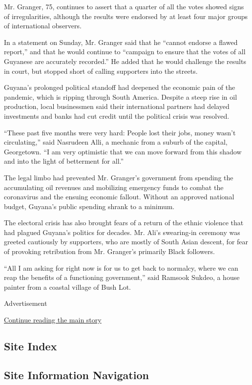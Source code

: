Mr. Granger, 75, continues to assert that a quarter of all the votes
showed signs of irregularities, although the results were endorsed by at
least four major groups of international observers.

In a statement on Sunday, Mr. Granger said that he ``cannot endorse a
flawed report,'' and that he would continue to ``campaign to ensure that
the votes of all Guyanese are accurately recorded.'' He added that he
would challenge the results in court, but stopped short of calling
supporters into the streets.

Guyana's prolonged political standoff had deepened the economic pain of
the pandemic, which is ripping through South America. Despite a steep
rise in oil production, local businessmen said their international
partners had delayed investments and banks had cut credit until the
political crisis was resolved.

``These past five months were very hard: People lost their jobs, money
wasn't circulating,'' said Nasrudeen Alli, a mechanic from a suburb of
the capital, Georgetown. ``I am very optimistic that we can move forward
from this shadow and into the light of betterment for all.''

The legal limbo had prevented Mr. Granger's government from spending the
accumulating oil revenues and mobilizing emergency funds to combat the
coronavirus and the ensuing economic fallout. Without an approved
national budget, Guyana's public spending shrank to a minimum.

The electoral crisis has also brought fears of a return of the ethnic
violence that had plagued Guyana's politics for decades. Mr. Ali's
swearing-in ceremony was greeted cautiously by supporters, who are
mostly of South Asian descent, for fear of provoking retribution from
Mr. Granger's primarily Black followers.

``All I am asking for right now is for us to get back to normalcy, where
we can reap the benefits of a functioning government,'' said Ramsook
Sukdeo, a house painter from a coastal village of Bush Lot.

Advertisement

\protect\hyperlink{after-bottom}{Continue reading the main story}

\hypertarget{site-index}{%
\subsection{Site Index}\label{site-index}}

\hypertarget{site-information-navigation}{%
\subsection{Site Information
Navigation}\label{site-information-navigation}}

